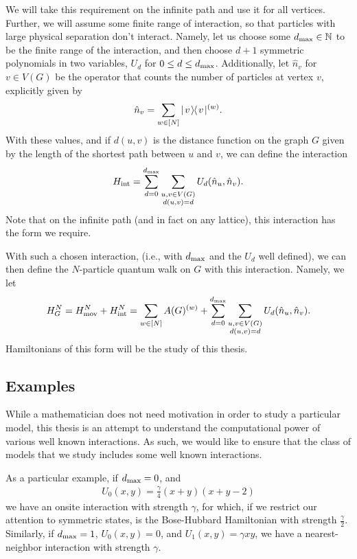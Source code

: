 \documentclass[../thesis-main/thesis-main]{subfiles}
\begin{document}
We will take this requirement on the infinite path and use it for all vertices.  Further, we will assume some finite range of interaction, so that particles with large physical separation don't interact.   Namely, let us choose some $d_{\text{max}} \in \mathbb{N}$ to be the finite range of the interaction, and then choose $d+1$ symmetric polynomials in two variables, $U_{d}$ for $0\leq d \leq d_{\text{max}}$.  Additionally, let $\hat{n}_v$ for $v\in V(G)$ be the operator that counts the number of particles at vertex $v$, explicitly given by 
\begin{align}
  \hat{n}_v = \sum_{w\in [N]} |\mspace{2mu} v \mspace{2mu} \rangle\mspace{-2mu}\langle\mspace{2mu} v \mspace{2mu} |^{(w)}.
\end{align}
With these values, and if $d(u,v)$ is the distance function on the graph $G$ given by the length of the shortest path between $u$ and $v$, we can define the interaction
\begin{align}
  H_{\text{int}} = \sum_{d=0}^{d_{\text{max}}} \sum_{\substack{ u,v\in V(G)\\d(u,v) = d}}U_{d} (\hat{n}_u,\hat{n}_v).
\end{align}
Note that on the infinite path (and in fact on any lattice), this interaction has the form we require.

With such a chosen interaction, (i.e., with $d_{\text{max}}$ and the $U_d$ well defined), we can then define the $N$-particle quantum walk on $G$ with this interaction.  Namely, we let 
\begin{align}
  H_G^N = H_{\text{mov}}^N + H_{\text{int}}^N = \sum_{w\in [N]} A(G)^{(w)} + \sum_{d=0}^{d_{\text{max}}}  \sum_{\substack{ u,v\in V(G)\\d(u,v) = d}}U_{d} (\hat{n}_u,\hat{n}_v). 
  \label{eq:MPQW_H_defn}
\end{align}
Hamiltonians of this form will be the study of this thesis.

\subsection{Examples}

While a mathematician does not need motivation in order to study a particular model, this thesis is an attempt to understand the computational power of various well known interactions.  As such, we would like to ensure that the class of models that we study includes some well known interactions.


As a particular example, if $d_{\text{max}} = 0$, and 
\begin{align}
  U_0(x,y) = \frac{\gamma }{4}(x + y) (x + y -2) \label{eq:bh_int}
\end{align}
we have an onsite interaction with strength $\gamma$, for which, if we restrict our attention to symmetric states, is the Bose-Hubbard Hamiltonian with strength $\frac{\gamma}{2}$.  Similarly, if $d_{\text{max}} = 1$, $U_0 (x,y) = 0$, and $U_1(x,y) = \gamma xy$, we have a nearest-neighbor interaction with strength $\gamma$.
\end{document}
